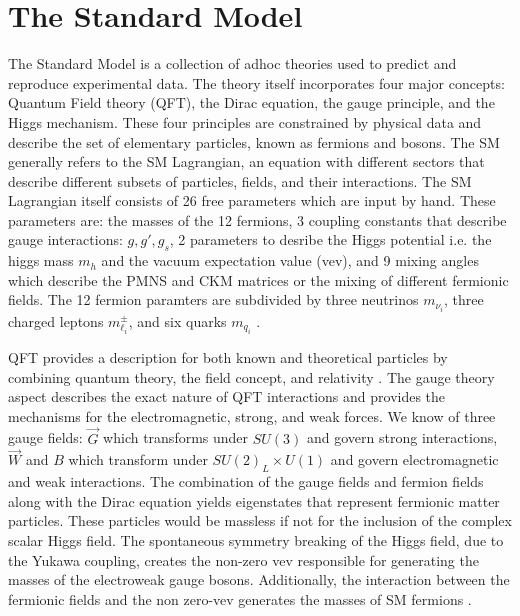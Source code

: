 \section{The Standard Model}

The Standard Model is a collection of adhoc theories used to predict and reproduce experimental data. The theory itself incorporates four major concepts: Quantum Field theory (QFT), the Dirac equation, the gauge principle, and the Higgs mechanism. These four principles are constrained by physical data and describe the set of elementary particles, known as fermions and bosons. The SM generally refers to the SM Lagrangian, an equation with different sectors that describe different subsets of particles, fields, and their interactions. The SM Lagrangian itself consists of 26 free parameters which are input by hand. These parameters are: the masses of the 12 fermions, 3 coupling constants that describe gauge interactions: $g, g', g_s$, 2 parameters to desribe the Higgs potential i.e. the higgs mass $m_h$ and the vacuum expectation value (vev), and 9 mixing angles which describe the  PMNS and CKM matrices or the mixing of different fermionic fields. The 12 fermion paramters are subdivided by three neutrinos $m_{\nu_i}$, three charged leptons $m_{\ell_i}^\pm$, and six quarks $m_{q_i}$ \cite{Thomson:2013zua}.

QFT provides a description for both known and theoretical particles by combining quantum theory, the field concept, and relativity \cite{Peskin:1995ev}. The gauge theory aspect describes the exact nature of QFT interactions and provides the mechanisms for the electromagnetic, strong, and weak forces.  We know of three gauge fields:  $\vec{G}$ which transforms under $SU(3)$ and govern strong interactions, $\vec{W}$ and $B$ which transform under $SU(2)_L \times U(1)$ and govern electromagnetic and weak interactions. The combination of the gauge fields and fermion fields along with the Dirac equation yields eigenstates that represent fermionic matter particles. These particles would be massless if not for the inclusion of the complex scalar Higgs field.  The spontaneous symmetry breaking of the Higgs field, due to the Yukawa coupling, creates the non-zero vev responsible for generating the masses of the electroweak gauge bosons. Additionally, the interaction between the fermionic fields and the non zero-vev generates the masses of SM fermions \cite{Higgs:1966ev}\cite{Bernardi:2008zz}.

